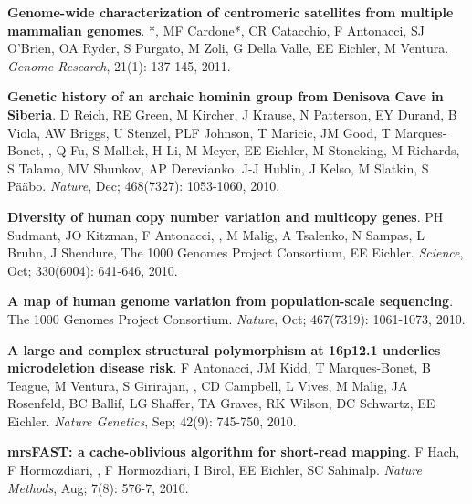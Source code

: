 \vspace{-.2cm}
    {\bf Genome-wide characterization of centromeric satellites from multiple mammalian genomes}.
    \calkan{}*, MF Cardone*, CR Catacchio, F Antonacci,
    SJ O'Brien, OA Ryder, S Purgato, M Zoli, G Della Valle, EE Eichler, M Ventura.
    {\em Genome Research}, 21(1): 137-145, 2011.
    
\vspace{-.2cm}
    {\bf Genetic history of an archaic hominin group from Denisova Cave in Siberia}.
    D Reich, RE Green, M Kircher, J Krause, 
    N Patterson, EY Durand, B Viola, AW Briggs, 
    U Stenzel, PLF Johnson, T Maricic, JM Good, 
    T Marques-Bonet, \calkan{}, Q Fu, S Mallick, H Li, 
    M Meyer, EE Eichler, M Stoneking, M Richards, 
    S Talamo, MV Shunkov, AP Derevianko, J-J Hublin, 
    J Kelso, M Slatkin, S P\"{a}\"{a}bo.
    {\em Nature}, Dec; 468(7327): 1053-1060, 2010.
    
\vspace{-.2cm}
    {\bf Diversity of human copy number variation and multicopy genes}. PH Sudmant, JO Kitzman, F Antonacci, 
    \calkan{}, M Malig, A Tsalenko, N Sampas, L Bruhn, J Shendure, The 1000 Genomes Project Consortium, EE Eichler.
    {\em Science}, Oct; 330(6004): 641-646, 2010.

    \clearpage
    
\vspace{-.2cm}
    {\bf A map of human genome variation from population-scale sequencing}. The 1000 Genomes Project Consortium.
    {\em Nature}, Oct; 467(7319): 1061-1073, 2010.


\vspace{-.2cm}
    {\bf A large and complex structural polymorphism at 16p12.1 underlies microdeletion disease risk}. F Antonacci, JM Kidd,
     T Marques-Bonet, B Teague, M Ventura, S Girirajan, \calkan{}, CD Campbell, L Vives, M Malig, 
    JA Rosenfeld, BC Ballif, LG Shaffer, TA Graves, RK Wilson, DC Schwartz, EE Eichler. {\em Nature Genetics}, Sep; 42(9): 745-750, 2010.
    
\vspace{-.2cm}
    {\bf mrsFAST: a cache-oblivious algorithm for short-read mapping}. F  Hach,  F Hormozdiari, \calkan{}, F Hormozdiari,
    I Birol,  EE Eichler, SC Sahinalp. {\em Nature Methods}, Aug; 7(8): 576-7, 2010.
    
